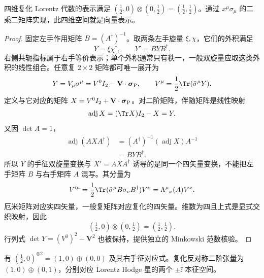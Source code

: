 \begin{proposition}[异手征旋量的向量表示]
四维复化 Lorentz 代数的表示满足 $(\tfrac12,0)\otimes(0,\tfrac12)=(\tfrac12,\tfrac12)$。通过 $x^\mu\sigma_\mu$ 的二乘二矩阵实现，此四维空间就是向量表示。
\end{proposition}

\begin{proof}
 固定左手作用矩阵 $B=(A^\dagger)^{-1}$。取两条左手旋量 $\xi,\chi$，它们的外积满足
\begin{equation*}
 Y=\xi\chi^\dagger,\qquad Y'=BYB^\dagger.
\end{equation*}
右侧共轭指标属于右手等价表示；单个外积通常只有秩一，一般双旋量应取这类外积的线性组合。任意复 $2\times2$ 矩阵都可唯一展开为
\begin{equation*}
 Y=V_\mu\sigma^\mu=V^0I_2-\mathbf V\cdot\boldsymbol\sigma_{\rm P},
 \qquad V^\mu=\frac12\Tr(\bar\sigma^\mu Y).
\end{equation*}
定义与它对应的矩阵 $X=V^0I_2+\mathbf V\cdot\boldsymbol\sigma_{\rm P}$。对二阶矩阵，伴随矩阵是线性映射
\begin{equation*}
 \operatorname{adj}X=(\Tr X)I_2-X=Y.
\end{equation*}
又因 $\det A=1$，
\begin{align*}
 \operatorname{adj}(AXA^\dagger)
 &=(A^\dagger)^{-1}(\operatorname{adj}X)A^{-1}\\
 &=BYB^\dagger.
\end{align*}
所以 $Y$ 的手征双旋量变换与 $X'=AXA^\dagger$ 诱导的是同一个四矢量变换，不能把左手矩阵 $B$ 与右手矩阵 $A$ 混写。其分量为
\begin{equation*}
 V'^\mu=\frac12\Tr(\bar\sigma^\mu B\sigma_\nu B^\dagger)V^\nu
 =\Lambda^\mu{}_{\nu}(A)V^\nu.
\end{equation*}
厄米矩阵对应实四矢量，一般复矩阵对应复化的四矢量。维数为四且上式是显式交织映射，因此
\begin{equation*}
 (\tfrac12,0)\otimes(0,\tfrac12)=(\tfrac12,\tfrac12).
\end{equation*}
行列式 $\det Y=(V^0)^2-\mathbf V^2$ 也被保持，提供独立的 Minkowski 范数核验。
\end{proof}

\begin{proposition}[同手征旋量与二形式分解]
有 $(\tfrac12,0)^{\otimes2}=(1,0)\oplus(0,0)$ 及其右手征对应式。复化反对称二阶张量为 $(1,0)\oplus(0,1)$，分别对应 Lorentz Hodge 星的两个 $\pm\ii$ 本征空间。
\end{proposition}

